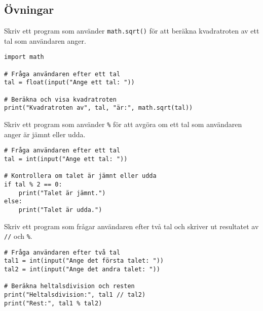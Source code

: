 \subsection{Övningar}
\begin{exercise}
Skriv ett program som använder \texttt{math.sqrt()} för att beräkna kvadratroten av ett tal som användaren anger.
\end{exercise}

\begin{solution}
\begin{lstlisting}
import math

# Fråga användaren efter ett tal
tal = float(input("Ange ett tal: "))

# Beräkna och visa kvadratroten
print("Kvadratroten av", tal, "är:", math.sqrt(tal))
\end{lstlisting}
\end{solution}

\begin{exercise}
Skriv ett program som använder \texttt{\%} för att avgöra om ett tal som användaren anger är jämnt eller udda.
\end{exercise}

\begin{solution}
\begin{lstlisting}
# Fråga användaren efter ett tal
tal = int(input("Ange ett tal: "))

# Kontrollera om talet är jämnt eller udda
if tal % 2 == 0:
    print("Talet är jämnt.")
else:
    print("Talet är udda.")
\end{lstlisting}
\end{solution}

\begin{exercise}
Skriv ett program som frågar användaren efter två tal och skriver ut resultatet av \texttt{//} och \texttt{\%}.
\end{exercise}

\begin{solution}
\begin{lstlisting}
# Fråga användaren efter två tal
tal1 = int(input("Ange det första talet: "))
tal2 = int(input("Ange det andra talet: "))

# Beräkna heltalsdivision och resten
print("Heltalsdivision:", tal1 // tal2)
print("Rest:", tal1 % tal2)
\end{lstlisting}
\end{solution}

